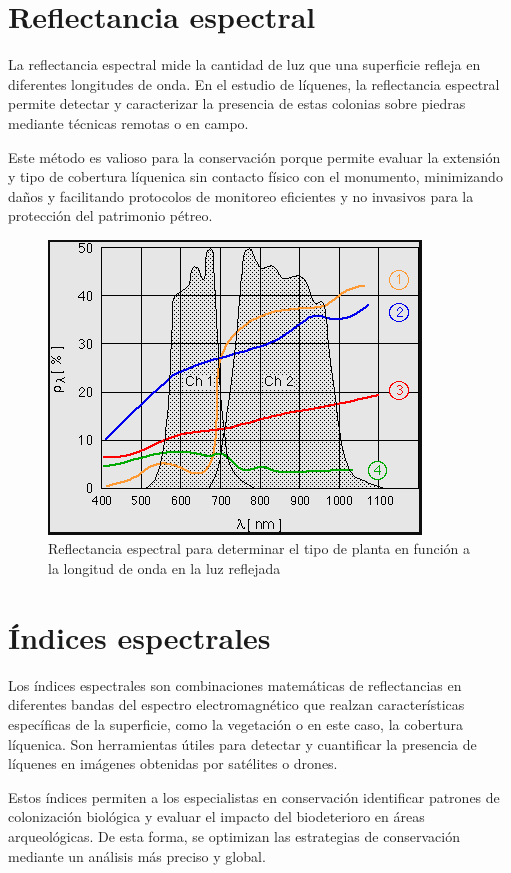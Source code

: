 \section{Reflectancia espectral}

La reflectancia espectral mide la cantidad de luz que una superficie refleja en diferentes longitudes de onda. En el estudio de líquenes, la reflectancia espectral permite detectar y caracterizar la presencia de estas colonias sobre piedras mediante técnicas remotas o en campo.

Este método es valioso para la conservación porque permite evaluar la extensión y tipo de cobertura líquenica sin contacto físico con el monumento, minimizando daños y facilitando protocolos de monitoreo eficientes y no invasivos para la protección del patrimonio pétreo.

\begin{figure}[h]
	\centering
	\includegraphics[width=0.5\linewidth]{media/reflectancia-espectral}
	\caption{Reflectancia espectral para determinar el tipo de planta en función a la longitud de onda en la luz reflejada}
	\label{fig:reflectancia-espectral}
\end{figure}


\section{Índices espectrales}

Los índices espectrales son combinaciones matemáticas de reflectancias en diferentes bandas del espectro electromagnético que realzan características específicas de la superficie, como la vegetación o en este caso, la cobertura líquenica. Son herramientas útiles para detectar y cuantificar la presencia de líquenes en imágenes obtenidas por satélites o drones.

Estos índices permiten a los especialistas en conservación identificar patrones de colonización biológica y evaluar el impacto del biodeterioro en áreas arqueológicas. De esta forma, se optimizan las estrategias de conservación mediante un análisis más preciso y global.

